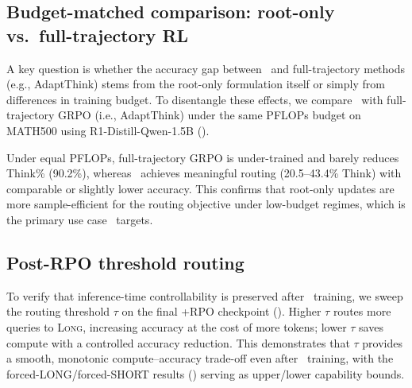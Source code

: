\subsection{Budget-matched comparison: root-only vs.\ full-trajectory RL}
\label{sec:budget_matched}

A key question is whether the accuracy gap between \Ours~and full-trajectory methods (e.g., AdaptThink) stems from the root-only formulation itself or simply from differences in training budget. To disentangle these effects, we compare \Ours~with full-trajectory GRPO (i.e., AdaptThink) under the same PFLOPs budget on MATH500 using R1-Distill-Qwen-1.5B ().

\begin{table}[t]
\centering
\small
\caption{Budget-matched comparison on MATH500 (R1-Distill-1.5B). Under equal PFLOPs ($\sim$10K), full-trajectory GRPO becomes under-trained and achieves only modest routing (Think\%${=}90.2\%$), while \Ours~achieves comparable accuracy with substantially lower Think\%. Different \Ours~checkpoints trace a Pareto frontier between accuracy and compute.}
\label{tab:budget_matched}
\end{table}

Under equal PFLOPs, full-trajectory GRPO is under-trained and barely reduces Think\% (90.2\%), whereas \Ours~achieves meaningful routing (20.5--43.4\% Think) with comparable or slightly lower accuracy. This confirms that root-only updates are more sample-efficient for the routing objective under low-budget regimes, which is the primary use case \Ours~targets.

\subsection{Post-RPO threshold routing}
\label{sec:post_rpo_threshold}

To verify that inference-time controllability is preserved after \Ours~training, we sweep the routing threshold $\tau$ on the final +RPO checkpoint (). Higher $\tau$ routes more queries to \textsc{Long}, increasing accuracy at the cost of more tokens; lower $\tau$ saves compute with a controlled accuracy reduction. This demonstrates that $\tau$ provides a smooth, monotonic compute--accuracy trade-off even after \Ours~training, with the forced-LONG/forced-SHORT results () serving as upper/lower capability bounds.

